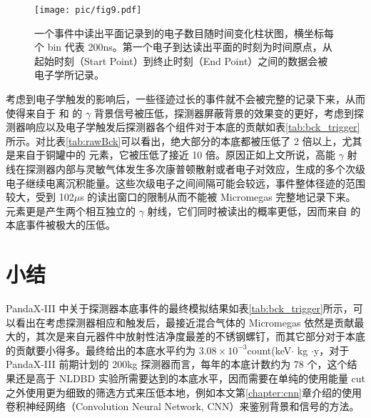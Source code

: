 \begin{figure}
    \centering
    \texttt{[image: pic/fig9.pdf]}
    \caption{一个事件中读出平面记录到的电子数目随时间变化柱状图，横坐标每个 bin 代表 200ns。第一个电子到达读出平面的时刻为时间原点，从起始时刻（Start Point）到终止时刻（End Point）之间的数据会被电子学所记录。}
    \label{fig:trigger}
\end{figure}

考虑到电子学触发的影响后，一些径迹过长的事件就不会被完整的记录下来，从而使得来自于 \utte 和 \thttt 的 $\gamma$ 背景信号被压低，探测器屏蔽背景的效果变的更好，考虑到探测器响应以及电子学触发后探测器各个组件对于本底的贡献如表\ref{tab:bck_trigger}所示。对比表\ref{tab:rawBck}可以看出，绝大部分的本底都被压低了 2 倍以上，尤其是来自于铜罐中的 \cose 元素，它被压低了接近 10 倍。原因正如上文所说，高能 $\gamma$ 射线在探测器内部与灵敏气体发生多次康普顿散射或者电子对效应，生成的多个次级电子继续电离沉积能量。这些次级电子之间间隔可能会较远，事件整体径迹的范围较大，受到 102$\mu$s 的读出窗口的限制从而不能被 Micromegas 完整地记录下来。\cose 元素更是产生两个相互独立的 $\gamma$ 射线，它们同时被读出的概率更低，因而来自 \cose 的本底事件被极大的压低。

\section{小结}

PandaX-III 中关于探测器本底事件的最终模拟结果如表\ref{tab:bck_trigger}所示，可以看出在考虑探测器相应和触发后，最接近混合气体的 Micromegas 依然是贡献最大的，其次是来自元器件中放射性洁净度最差的不锈钢螺钉，而其它部分对于本底的贡献要小得多。最终给出的本底水平约为 $3.08\times 10^{-3}$count\/(keV$\cdot$ kg $\cdot$y，对于 PandaX-III 前期计划的 200kg 探测器而言，每年的本底计数约为 78 个，这个结果还是高于 NLDBD 实验所需要达到的本底水平，因而需要在单纯的使用能量 cut 之外使用更为细致的筛选方式来压低本地，例如本文第\ref{chapter:cnn}章介绍的使用卷积神经网络（Convolution Neural Network, CNN）来鉴别背景和信号的方法。

